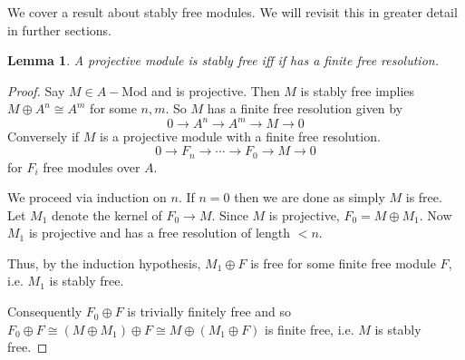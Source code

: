\documentclass[12pt]{report}
\numberwithin{equation}{section}
\newcounter{dummy} \numberwithin{dummy}{section}
\newtheorem{lemma}[dummy]{Lemma}
\begin{document}
	We cover a result about stably free modules. We will revisit this in greater detail in further sections.
		\begin{lemma}\label{stabfreefinfreeres}
		A projective module is stably free iff if has a finite free resolution.
	\end{lemma}
	\begin{proof}
		Say $M \in A-$Mod and is projective. Then $M$ is stably free implies $M \oplus A^n \cong A^m$ for some $n,m$. So $M$ has a finite free resolution given by
		\[ 0 \to A^n \to A^m \to M \to 0 \]
		Conversely if $M$ is a projective module with a finite free resolution.
		\[ 0 \to F_n \to \cdots \to F_0 \to M \to 0 \] for $F_i$ free modules over $A$.
		
		We proceed via induction on $n$. If $n=0$ then we are done as simply $M$ is free.
		Let $M_1$ denote the kernel of $F_0 \to M$. Since $M$ is projective, $F_0 = M \oplus M_1$. Now $M_1$ is projective and has a free resolution of length $< n$.
		
		Thus, by the induction hypothesis, $M_1 \oplus F$ is free for some finite free module $F$, i.e. $M_1$ is stably free.
		
		Consequently $F_0 \oplus F$ is trivially finitely free and so $F_0\oplus F \cong (M\oplus M_1) \oplus F \cong M \oplus (M_1 \oplus F)$ is finite free, i.e. $M$ is stably free.
	\end{proof}
	
\end{document}
